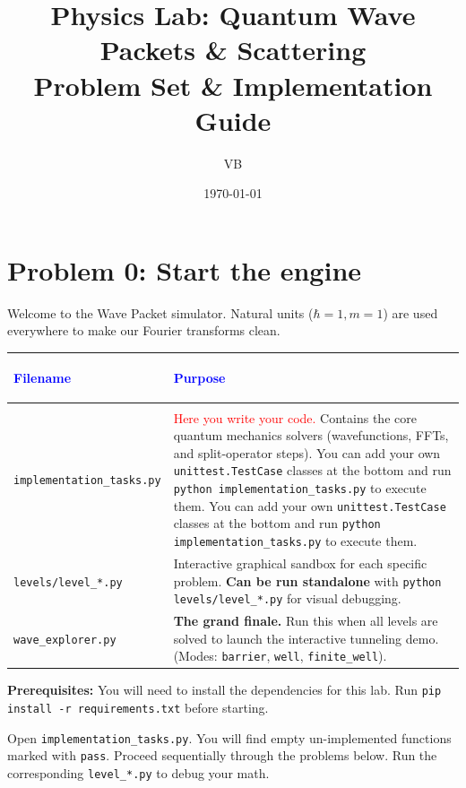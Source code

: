 \documentclass[11pt]{article}
\title{Physics Lab: Quantum Wave Packets \& Scattering \\ \large Problem Set \& Implementation Guide}
\author{VB}
\date{\today}
\begin{document}
\maketitle

\section*{Problem 0: Start the engine}

Welcome to the Wave Packet simulator. Natural units ($\hbar=1, m=1$) are used everywhere to make our Fourier transforms clean.

\begin{center}
\renewcommand{\arraystretch}{1.5}
\begin{tabularx}{\textwidth}{@{} >{\bfseries\raggedright\arraybackslash}p{5.5cm} X @{}}
\toprule
\textcolor{blue}{Filename} & \textcolor{blue}{Purpose} \\ \midrule
\multicolumn{2}{@{}l}{\textbf{Direct Interaction}} \\ \midrule
\lstinline|implementation_tasks.py| & \textcolor{red}{Here you write your code.} Contains the core quantum mechanics solvers (wavefunctions, FFTs, and split-operator steps). You can add your own \lstinline|unittest.TestCase| classes at the bottom and run \lstinline|python implementation_tasks.py| to execute them. You can add your own \lstinline|unittest.TestCase| classes at the bottom and run \lstinline|python implementation_tasks.py| to execute them. \\
\lstinline|levels/level_*.py| & Interactive graphical sandbox for each specific problem. \textbf{Can be run standalone} with \lstinline|python levels/level_*.py| for visual debugging. \\
\lstinline|wave_explorer.py| & \textbf{The grand finale.} Run this when all levels are solved to launch the interactive tunneling demo. (Modes: \lstinline|barrier|, \lstinline|well|, \lstinline|finite_well|). \\ \midrule
\bottomrule
\end{tabularx}
\end{center}

\textbf{Prerequisites:} You will need to install the dependencies for this lab. Run \lstinline|pip install -r requirements.txt| before starting.

\vspace{0.5cm}
Open \lstinline|implementation_tasks.py|. You will find empty un-implemented functions marked with \lstinline|pass|. Proceed sequentially through the problems below. Run the corresponding \lstinline|level_*.py| to debug your math. 
\end{document}
